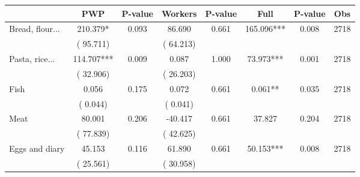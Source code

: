 
\begin{tabular}{l*{7}{c}}\hline&\multicolumn{1}{c}{PWP}&\multicolumn{1}{c}{P-value}&\multicolumn{1}{c}{Workers}&\multicolumn{1}{c}{P-value}&\multicolumn{1}{c}{Full}&\multicolumn{1}{c}{P-value}&\multicolumn{1}{c}{Obs} \\ \hline

 Bread, flour...       &            210.379*       &        0.093  &             86.690       &        0.661  &            165.096***       &              0.008 &  2718 \\ 
                       &       (      95.711)             &                               &       (      64.213)                     &                               &                                               &                                &                      \\ 

 Pasta, rice...       &            114.707***       &        0.009  &              0.087       &        1.000  &             73.973***       &              0.001 &  2718 \\ 
                       &       (      32.906)             &                               &       (      26.203)                     &                               &                                               &                                &                      \\ 

 Fish       &              0.056       &        0.175  &              0.072       &        0.661  &              0.061**       &              0.035 &  2718 \\ 
                       &       (       0.044)             &                               &       (       0.041)                     &                               &                                               &                                &                      \\ 

 Meat       &             80.001       &        0.206  &            -40.417       &        0.661  &             37.827       &              0.204 &  2718 \\ 
                       &       (      77.839)             &                               &       (      42.625)                     &                               &                                               &                                &                      \\ 

 Eggs and diary       &             45.153       &        0.116  &             61.890       &        0.661  &             50.153***       &              0.008 &  2718 \\ 
                       &       (      25.561)             &                               &       (      30.958)                     &                               &                                               &                                &                      \\ 


\end{tabular}
